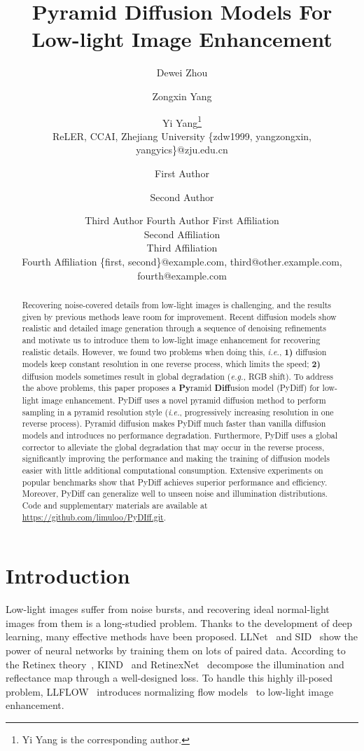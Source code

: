\documentclass{article}
\title{Pyramid Diffusion Models For Low-light Image Enhancement}
\author{
    Dewei Zhou \and Zongxin Yang \and Yi Yang\footnote{Yi Yang is the corresponding author.}\\
    \affiliations
    ReLER, CCAI, Zhejiang University
    \emails
    \{zdw1999, yangzongxin, yangyics\}@zju.edu.cn
}
\author{
First Author
\and
Second Author\and
Third Author\And
Fourth Author
\affiliations
First Affiliation\\
Second Affiliation\\
Third Affiliation\\
Fourth Affiliation
\emails
\{first, second\}@example.com,
third@other.example.com,
fourth@example.com
}
\def\eg{\emph{e.g.}}
\def\ie{\emph{i.e.}}
\begin{document}
\maketitle

\begin{abstract}
    Recovering noise-covered details from low-light images is challenging, and the results given by previous methods leave room for improvement. Recent diffusion models show realistic and detailed image generation through a sequence of denoising refinements and motivate us to introduce them to low-light image enhancement for recovering realistic details. However, we found two problems when doing this, \ie, \textbf{1)} diffusion models keep constant resolution in one reverse process, which limits the speed; \textbf{2)} diffusion models sometimes result in global degradation (\eg, RGB shift). To address the above problems, this paper proposes a \textbf{Py}ramid \textbf{Diff}usion model (PyDiff) for low-light image enhancement. PyDiff uses a novel pyramid diffusion method to perform sampling in a pyramid resolution style (\ie, progressively increasing resolution in one reverse process). Pyramid diffusion makes PyDiff much faster than vanilla diffusion models and introduces no performance degradation. Furthermore, PyDiff uses a global corrector to alleviate the global degradation that may occur in the reverse process, significantly improving the performance and making the training of diffusion models easier with little additional computational consumption. Extensive experiments on popular benchmarks show that PyDiff achieves superior performance and efficiency. Moreover, PyDiff can generalize well to unseen noise and illumination distributions. Code and supplementary materials are available at \url{https://github.com/limuloo/PyDIff.git}.

\end{abstract}


\section{Introduction}






Low-light images suffer from noise bursts, and recovering ideal normal-light images from them is a long-studied problem. Thanks to the development of deep learning, many effective methods have been proposed. LLNet~\cite{lore2017llnet} and SID~\cite{chen2018learning} show the power of neural networks by training them on lots of paired data. According to the Retinex theory~\cite{land1977retinex}, KIND~\cite{zhang2019kindling} and RetinexNet~\cite{wei2018deep} decompose the illumination and reflectance map through a well-designed loss. To handle this highly ill-posed problem, LLFLOW~\cite{wang2022low} introduces normalizing flow models~\cite{kingma2018glow} to low-light image enhancement.
\end{document}

